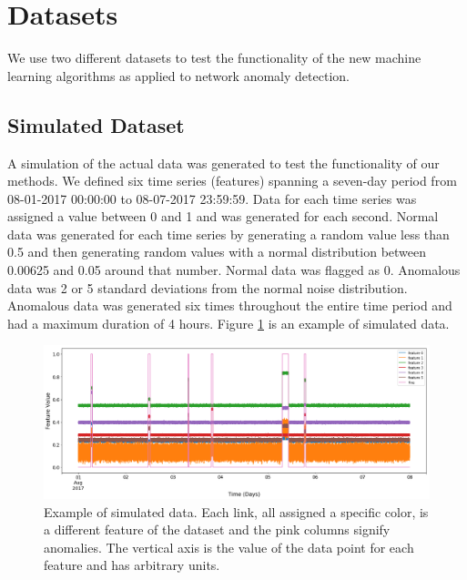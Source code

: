 \documentclass[5p]{elsarticle}
\begin{document}
\section{Datasets}

We use two different datasets to test the functionality of the new machine learning algorithms as applied to network anomaly detection. 

\subsection{Simulated Dataset}

A simulation of the actual data was generated to test the functionality of our methods. We defined six time series (features) spanning a seven-day period from 08-01-2017 00:00:00 to 08-07-2017 23:59:59. Data for each time series was assigned a value between 0 and 1 and was generated for each second. Normal data was generated for each time series by generating a random value less than 0.5 and then generating random values with a normal distribution between 0.00625 and 0.05 around that number. Normal data was flagged as 0. Anomalous data was 2 or 5 standard deviations from the normal noise distribution. Anomalous data was generated six times throughout the entire time period and had a maximum duration of 4 hours. Figure \ref{fig:untouched} is an example of simulated data. 

\begin{figure}[htbp]
    \centering
    \includegraphics[width=1.0\textwidth]{untouched.png}
    \caption{Example of simulated data. Each link, all assigned a specific color, is a different feature of the dataset and the pink columns signify anomalies. The vertical axis is the value of the data point for each feature and has arbitrary units.}
    \label{fig:untouched}
\end{figure}

\iffalse
\end{document}
